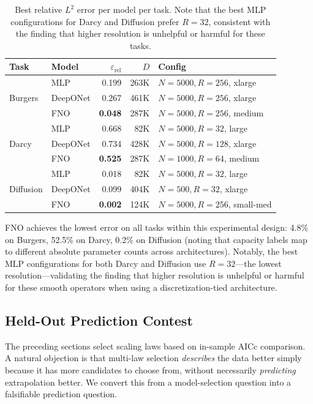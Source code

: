 \documentclass[11pt]{article}
\newcommand{\relLtwo}{\varepsilon_{\mathrm{rel}}}
\begin{document}
\begin{table}[h]
\centering
\caption{Best relative $L^2$ error per model per task. Note that the
best MLP configurations for Darcy and Diffusion prefer $R = 32$,
consistent with the finding that higher resolution is unhelpful or
harmful for these tasks.}
\label{tab:best}
\begin{tabular}{@{}llrrl@{}}
\toprule
\textbf{Task} & \textbf{Model} & \textbf{$\relLtwo$} & $D$ &
\textbf{Config} \\
\midrule
\multirow{3}{*}{Burgers}
  & MLP      & 0.199 & 263K & $N\!=\!5000, R\!=\!256$, xlarge \\
  & DeepONet & 0.267 & 461K & $N\!=\!5000, R\!=\!256$, xlarge \\
  & FNO      & \textbf{0.048} & 287K & $N\!=\!5000, R\!=\!256$, medium \\
\midrule
\multirow{3}{*}{Darcy}
  & MLP      & 0.668 & 82K & $N\!=\!5000, R\!=\!32$, large \\
  & DeepONet & 0.734 & 428K & $N\!=\!5000, R\!=\!128$, xlarge \\
  & FNO      & \textbf{0.525} & 287K & $N\!=\!1000, R\!=\!64$, medium \\
\midrule
\multirow{3}{*}{Diffusion}
  & MLP      & 0.018 & 82K & $N\!=\!5000, R\!=\!32$, large \\
  & DeepONet & 0.099 & 404K & $N\!=\!500, R\!=\!32$, xlarge \\
  & FNO      & \textbf{0.002} & 124K & $N\!=\!5000, R\!=\!256$, small-med \\
\bottomrule
\end{tabular}
\end{table}

FNO achieves the lowest error on all tasks within this experimental
design: 4.8\% on Burgers, 52.5\% on
Darcy, 0.2\% on Diffusion (noting that capacity labels map to
different absolute parameter counts across architectures). Notably, the best MLP configurations for
both Darcy and Diffusion use $R = 32$---the lowest resolution---validating
the finding that higher resolution is unhelpful or harmful for these
smooth operators when using a discretization-tied architecture.


\subsection{Held-Out Prediction Contest}
\label{sec:holdout}

The preceding sections select scaling laws based on in-sample AICc
comparison. A natural objection is that multi-law selection
\emph{describes} the data better simply because it has more candidates
to choose from, without necessarily \emph{predicting} extrapolation
better. We convert this from a model-selection question into a
falsifiable prediction question.
\end{document}
